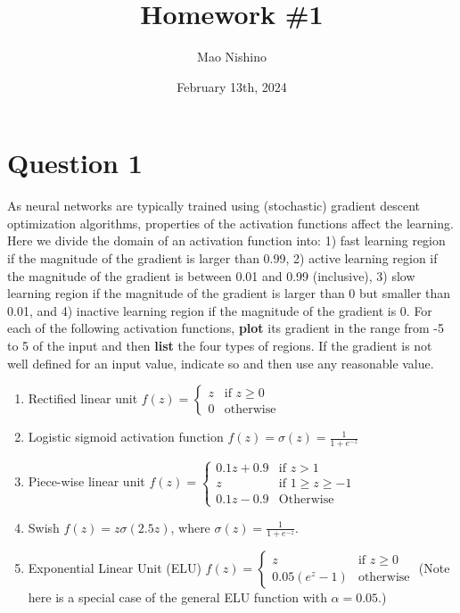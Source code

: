 \documentclass[
	12pt, %
]{../Template/fphw}
\title{Homework \#1} %
\author{Mao Nishino} %
\date{February 13th, 2024} %
\institute{Florida State University \\ Department of Computer Science} %
\begin{document}
\maketitle %


\section*{Question 1}

\begin{problem}
	As neural networks are typically trained using (stochastic) gradient descent optimization
algorithms, properties of the activation functions affect the learning. Here we divide the domain of an activation
function into: 1) fast learning region if the magnitude of the gradient is larger than 0.99, 2) active learning region if
the magnitude of the gradient is between 0.01 and 0.99 (inclusive), 3) slow learning region if the magnitude of the
gradient is larger than 0 but smaller than 0.01, and 4) inactive learning region if the magnitude of the gradient is 0.
For each of the following activation functions, \textbf{plot} its gradient in the range from -5 to 5 of the input and then \textbf{list}
the four types of regions. If the gradient is not well defined for an input value, indicate so and then use any reasonable
value.

\begin{enumerate}[label = (\arabic*)]
    \item Rectified linear unit \( f(z) = \begin{cases} z & \text{if } z \geq 0 \\ 0 & \text{otherwise} \end{cases} \)
    \item Logistic sigmoid activation function \( f(z) = \sigma(z) = \frac{1}{1+e^{-z}} \) 
    \item Piece-wise linear unit \( f(z) = \begin{cases} 0.1z+0.9 & \text{if } z> 1 \\ z & \text{if }1\geq z\geq -1 \\ 0.1z-0.9 & \text{Otherwise} \end{cases} \) 
    \item Swish \(f(z) =  z\sigma(2.5z)\), where $\sigma(z) = \frac{1}{1+e^{-z}}$.
    \item Exponential Linear Unit (ELU) \( f(z) = \begin{cases} z & \text{if } z \geq 0 \\ 0.05(e^z-1) & \text{otherwise} \end{cases} \) (Note here is a special case of the general ELU function with $\alpha=0.05$.)
\end{enumerate}

\end{problem}
\end{document}
